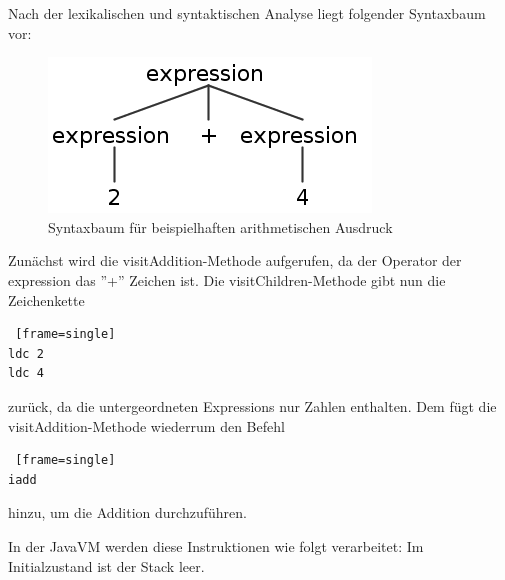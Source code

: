 \documentclass[12pt, a4paper, oneside, ngerman]{article}
\begin{document}
Nach der lexikalischen und syntaktischen Analyse liegt folgender Syntaxbaum vor:

\begin{figure}[h!]
\centering
\includegraphics[scale=0.4]{antlr4_parse_tree_visitAdditionVisitNumberBeispiel.png}
\caption{Syntaxbaum für beispielhaften arithmetischen Ausdruck}
\label{fig:method}
\end{figure}

Zunächst wird die visitAddition-Methode aufgerufen, da der Operator der expression das ''+'' Zeichen ist. Die visitChildren-Methode gibt nun die Zeichenkette
\begin{lstlisting} [frame=single]
ldc 2
ldc 4
\end{lstlisting}
zurück, da die untergeordneten Expressions nur Zahlen enthalten. Dem fügt die visitAddition-Methode wiederrum den Befehl
\begin{lstlisting} [frame=single]
iadd
\end{lstlisting}
hinzu, um die Addition durchzuführen.
\linebreak

In der JavaVM werden diese Instruktionen wie folgt verarbeitet:
Im Initialzustand ist der Stack leer.
\end{document}
